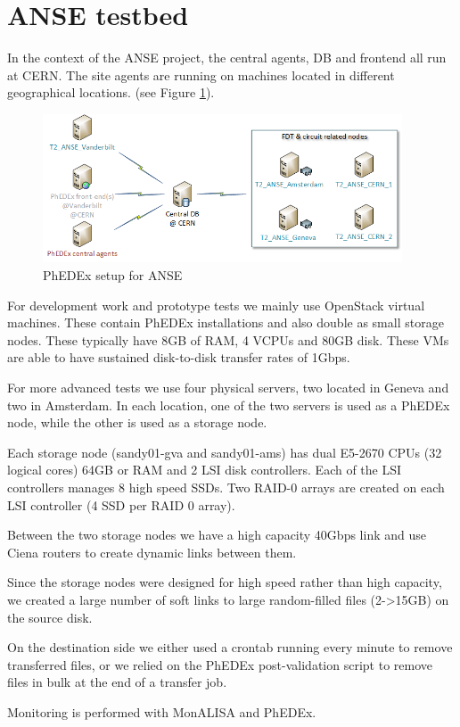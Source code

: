 \section{ANSE testbed}

In the context of the ANSE project, the central agents, DB and frontend all run
at CERN. The site agents are running on machines located in different geographical
locations. (see Figure \ref{fig:ANSE-setup}).

\begin{figure}[h]
  \centering
  \includegraphics[width=0.95\textwidth]{Figures/ANSE-setup.png}
  \caption{PhEDEx setup for ANSE}
  \label{fig:ANSE-setup}
\end{figure}

For development work and prototype tests we mainly use OpenStack virtual machines.
These contain PhEDEx installations and also double as small storage nodes. These
typically have 8GB of RAM, 4 VCPUs and 80GB disk. These VMs are able to have
sustained disk-to-disk transfer rates of 1Gbps.

For more advanced tests we use four physical servers, two located in Geneva and 
two in Amsterdam. In each location, one of the two servers is used as a PhEDEx node, 
while the other is used as a storage node.

Each storage node (sandy01-gva and sandy01-ams) has dual E5-2670 CPUs (32 logical cores)
64GB or RAM and 2 LSI disk controllers. Each of the LSI controllers manages
8 high speed SSDs. Two RAID-0 arrays are created on each LSI controller (4 SSD per
RAID 0 array).

Between the two storage nodes we have a high capacity 40Gbps link and use Ciena
routers to create dynamic links between them.

Since the storage nodes were designed for high speed rather than high capacity,
we created a large number of soft links to large random-filled files (2->15GB) 
on the source disk. 

On the destination side we either used a crontab running every minute to remove
transferred files, or we relied on the PhEDEx post-validation  script to remove 
files in bulk at the end of a transfer job.

Monitoring is performed with MonALISA\cite{MonALISA}\cite{MonALISA site} and PhEDEx.
